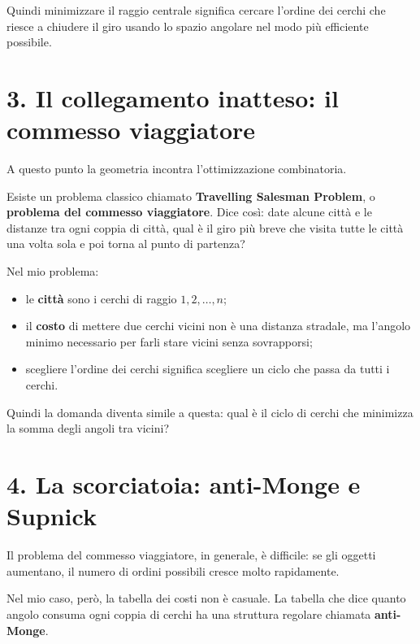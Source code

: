 \documentclass[11pt,a4paper]{article}
\begin{document}
Quindi minimizzare il raggio centrale significa cercare l'ordine dei cerchi che riesce a chiudere il giro usando lo spazio angolare nel modo più efficiente possibile.

{\color{navy}\section*{3. Il collegamento inatteso: il commesso viaggiatore}}

A questo punto la geometria incontra l'ottimizzazione combinatoria.

Esiste un problema classico chiamato \textbf{Travelling Salesman Problem}, o \textbf{problema del commesso viaggiatore}. Dice così: date alcune città e le distanze tra ogni coppia di città, qual è il giro più breve che visita tutte le città una volta sola e poi torna al punto di partenza?

Nel mio problema:
\begin{itemize}
    \setlength{\itemsep}{0pt}
    \setlength{\parskip}{0pt}
    \item le \textbf{città} sono i cerchi di raggio $1, 2, \dots, n$;
    \item il \textbf{costo} di mettere due cerchi vicini non è una distanza stradale, ma l'angolo minimo necessario per farli stare vicini senza sovrapporsi;
    \item scegliere l'ordine dei cerchi significa scegliere un ciclo che passa da tutti i cerchi.
\end{itemize}

Quindi la domanda diventa simile a questa: qual è il ciclo di cerchi che minimizza la somma degli angoli tra vicini?

{\color{navy}\section*{4. La scorciatoia: anti-Monge e Supnick}}

Il problema del commesso viaggiatore, in generale, è difficile: se gli oggetti aumentano, il numero di ordini possibili cresce molto rapidamente.

Nel mio caso, però, la tabella dei costi non è casuale. La tabella che dice quanto angolo consuma ogni coppia di cerchi ha una struttura regolare chiamata \textbf{anti-Monge}.
\end{document}
